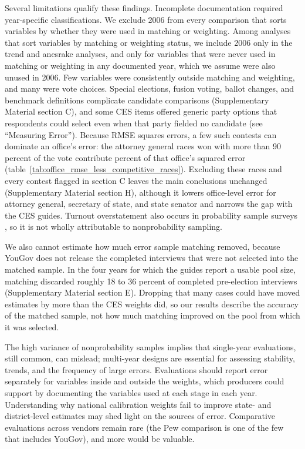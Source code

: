 \documentclass[12pt]{article}
\begin{document}
Several limitations qualify these findings. Incomplete documentation required year-specific classifications. We exclude 2006 from every comparison that sorts variables by whether they were used in matching or weighting. Among analyses that sort variables by matching or weighting status, we include 2006 only in the trend and anesrake analyses, and only for variables that were never used in matching or weighting in any documented year, which we assume were also unused in 2006. Few variables were consistently outside matching and weighting, and many were vote choices. Special elections, fusion voting, ballot changes, and benchmark definitions complicate candidate comparisons (Supplementary Material section C), and some CES items offered generic party options that respondents could select even when that party fielded no candidate (see ``Measuring Error''). Because RMSE squares errors, a few such contests can dominate an office's error: the \SensAGNGtNinety{} attorney general races won with more than 90 percent of the vote contribute \SensAGShareSSE{} percent of that office's squared error (table~\ref{tab:office_rmse_less_competitive_races}). Excluding these races and every contest flagged in section C leaves the main conclusions unchanged (Supplementary Material section H), although it lowers office-level error for attorney general, secretary of state, and state senator and narrows the gap with the CES guides. Turnout overstatement also occurs in probability sample surveys \parencite{hammer_experiments_2014, debell_turnout_2020}, so it is not wholly attributable to nonprobability sampling.

We also cannot estimate how much error sample matching removed, because YouGov does not release the completed interviews that were not selected into the matched sample. In the four years for which the guides report a usable pool size, matching discarded roughly 18 to 36 percent of completed pre-election interviews (Supplementary Material section E). Dropping that many cases could have moved estimates by more than the CES weights did, so our results describe the accuracy of the matched sample, not how much matching improved on the pool from which it was selected.

The high variance of nonprobability samples implies that single-year evaluations, still common, can mislead; multi-year designs are essential for assessing stability, trends, and the frequency of large errors. Evaluations should report error separately for variables inside and outside the weights, which producers could support by documenting the variables used at each stage in each year. Understanding why national calibration weights fail to improve state- and district-level estimates may shed light on the sources of error. Comparative evaluations across vendors remain rare \mkbibparens{the Pew comparison \parencite{kennedy_evaluating_2016} is one of the few that includes YouGov}, and more would be valuable.
\end{document}
